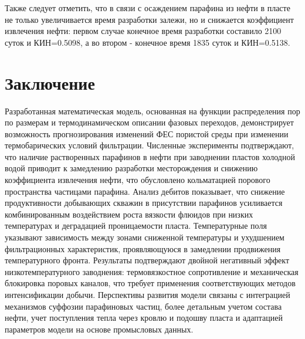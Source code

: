 \documentclass[12pt,twoside,a4paper]{uz_ku}
\begin{document}
	Также следует отметить, что в связи с осаждением парафина из нефти в пласте не только увеличивается время разработки залежи, но и снижается коэффициент извлечения нефти:  первом случае конечное время разработки составило 2100 суток и КИН=0.5098, а во втором - конечное время 1835 суток и КИН=0.5138. 

\section{Заключение}	
	Разработанная математическая модель, основанная на функции распределения пор по размерам и термодинамическом описании фазовых переходов, демонстрирует возможность прогнозирования изменений ФЕС пористой среды при изменении термобарических условий фильтрации. Численные эксперименты подтверждают, что наличие растворенных парафинов в нефти при заводнении пластов холодной водой  приводит к замедлению разработки месторождения и снижению коэффициента извлечения нефти, что обусловлено кольматацией порового пространства частицами парафина. Анализ дебитов показывает, что снижение продуктивности добывающих скважин в присутствии парафинов усиливается комбинированным воздействием роста вязкости флюидов при низких температурах и деградацией проницаемости пласта. Температурные поля указывают зависимость  между зонами сниженной температуры и ухудшением фильтрационных характеристик, проявляющуюся в замедлении продвижения температурного фронта. Результаты подтверждают двойной негативный эффект низкотемпературного заводнения: термовязкостное сопротивление и механическая блокировка поровых каналов, что требует применения соответствующих методов интенсификации добычи. Перспективы развития модели связаны с интеграцией механизмов суффозии парафиновых частиц, более детальным учетом состава нефти, учет поступления тепла через кровлю и подошву пласта и адаптацией параметров модели на основе промысловых данных.



\end{document}
